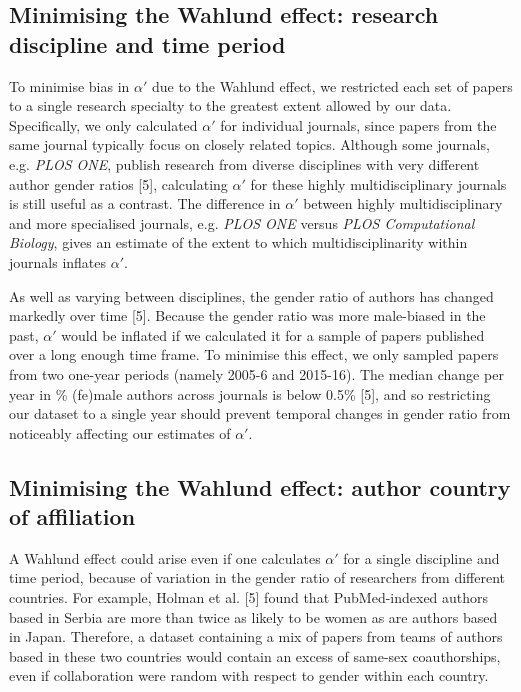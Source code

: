 \documentclass[12pt,]{article}
\begin{document}
\subsection{Minimising the Wahlund effect: research discipline and time
period}\label{minimising-the-wahlund-effect-research-discipline-and-time-period}

To minimise bias in \(\alpha'\) due to the Wahlund effect, we restricted
each set of papers to a single research specialty to the greatest extent
allowed by our data. Specifically, we only calculated \(\alpha'\) for
individual journals, since papers from the same journal typically focus
on closely related topics. Although some journals, e.g. \emph{PLOS ONE},
publish research from diverse disciplines with very different author
gender ratios {[}5{]}, calculating \(\alpha'\) for these highly
multidisciplinary journals is still useful as a contrast. The difference
in \(\alpha'\) between highly multidisciplinary and more specialised
journals, e.g. \emph{PLOS ONE} versus \emph{PLOS Computational Biology},
gives an estimate of the extent to which multidisciplinarity within
journals inflates \(\alpha'\).

As well as varying between disciplines, the gender ratio of authors has
changed markedly over time {[}5{]}. Because the gender ratio was more
male-biased in the past, \(\alpha'\) would be inflated if we calculated
it for a sample of papers published over a long enough time frame. To
minimise this effect, we only sampled papers from two one-year periods
(namely 2005-6 and 2015-16). The median change per year in \% (fe)male
authors across journals is below 0.5\% {[}5{]}, and so restricting our
dataset to a single year should prevent temporal changes in gender ratio
from noticeably affecting our estimates of \(\alpha'\).

\subsection{Minimising the Wahlund effect: author country of
affiliation}\label{minimising-the-wahlund-effect-author-country-of-affiliation}

A Wahlund effect could arise even if one calculates \(\alpha'\) for a
single discipline and time period, because of variation in the gender
ratio of researchers from different countries. For example, Holman et
al. {[}5{]} found that PubMed-indexed authors based in Serbia are more
than twice as likely to be women as are authors based in Japan.
Therefore, a dataset containing a mix of papers from teams of authors
based in these two countries would contain an excess of same-sex
coauthorships, even if collaboration were random with respect to gender
within each country.
\end{document}
